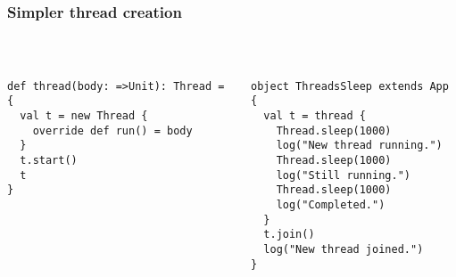 \documentclass[aspectratio=169]{beamer}
\begin{document}
\begin{frame}%
\end{frame}


\begin{frame}[fragile]\frametitle{Simpler thread creation}
~\\[-8mm]
\begin{columns}
\begin{column}{0.49\textwidth}
\begin{lstlisting}[emph={thread,run,start}]
def thread(body: =>Unit): Thread = {
  val t = new Thread {
    override def run() = body
  }
  t.start()
  t
}
\end{lstlisting}
\end{column}
\begin{column}{0.49\textwidth}
\pause
{}
\begin{lstlisting}[emph={sleep,log,thread,join}]
object ThreadsSleep extends App {
  val t = thread {
    Thread.sleep(1000)
    log("New thread running.")
    Thread.sleep(1000)
    log("Still running.")
    Thread.sleep(1000)
    log("Completed.")
  }
  t.join()
  log("New thread joined.")
}
\end{lstlisting}
\end{column}
\end{columns}
\end{frame}


\begin{frame}%
  \centering
\end{frame}
\end{document}
